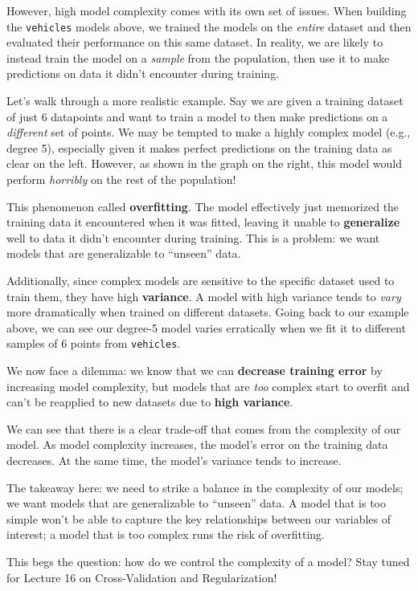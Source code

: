 \documentclass[
  letterpaper,
  DIV=11,
  numbers=noendperiod]{scrreprt}
\begin{document}
However, high model complexity comes with its own set of issues. When
building the \texttt{vehicles} models above, we trained the models on
the \emph{entire} dataset and then evaluated their performance on this
same dataset. In reality, we are likely to instead train the model on a
\emph{sample} from the population, then use it to make predictions on
data it didn't encounter during training.

Let's walk through a more realistic example. Say we are given a training
dataset of just 6 datapoints and want to train a model to then make
predictions on a \emph{different} set of points. We may be tempted to
make a highly complex model (e.g., degree 5), especially given it makes
perfect predictions on the training data as clear on the left. However,
as shown in the graph on the right, this model would perform
\emph{horribly} on the rest of the population!

This phenomenon called \textbf{overfitting}. The model effectively just
memorized the training data it encountered when it was fitted, leaving
it unable to \textbf{generalize} well to data it didn't encounter during
training. This is a problem: we want models that are generalizable to
``unseen'' data.

Additionally, since complex models are sensitive to the specific dataset
used to train them, they have high \textbf{variance}. A model with high
variance tends to \emph{vary} more dramatically when trained on
different datasets. Going back to our example above, we can see our
degree-5 model varies erratically when we fit it to different samples of
6 points from \texttt{vehicles}.

We now face a dilemma: we know that we can \textbf{decrease training
error} by increasing model complexity, but models that are \emph{too}
complex start to overfit and can't be reapplied to new datasets due to
\textbf{high variance}.

We can see that there is a clear trade-off that comes from the
complexity of our model. As model complexity increases, the model's
error on the training data decreases. At the same time, the model's
variance tends to increase.

The takeaway here: we need to strike a balance in the complexity of our
models; we want models that are generalizable to ``unseen'' data. A
model that is too simple won't be able to capture the key relationships
between our variables of interest; a model that is too complex runs the
risk of overfitting.

This begs the question: how do we control the complexity of a model?
Stay tuned for Lecture 16 on Cross-Validation and Regularization!
\end{document}
